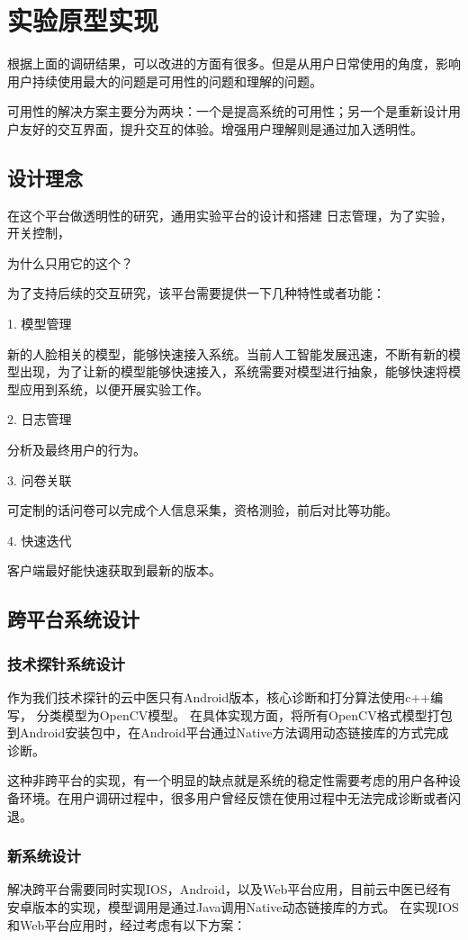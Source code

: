 \chapter{实验原型实现}
根据上面的调研结果，可以改进的方面有很多。但是从用户日常使用的角度，影响用户持续使用最大的问题是可用性的问题和理解的问题。

可用性的解决方案主要分为两块：一个是提高系统的可用性；另一个是重新设计用户友好的交互界面，提升交互的体验。增强用户理解则是通过加入透明性。

\section{设计理念}

在这个平台做透明性的研究，通用实验平台的设计和搭建
日志管理，为了实验，
开关控制，

为什么只用它的这个？

为了支持后续的交互研究，该平台需要提供一下几种特性或者功能：

1. 模型管理

新的人脸相关的模型，能够快速接入系统。当前人工智能发展迅速，不断有新的模型出现，为了让新的模型能够快速接入，系统需要对模型进行抽象，能够快速将模型应用到系统，以便开展实验工作。

2. 日志管理

分析及最终用户的行为。

3. 问卷关联

可定制的话问卷可以完成个人信息采集，资格测验，前后对比等功能。

4. 快速迭代

客户端最好能快速获取到最新的版本。

\section{跨平台系统设计}
\subsection{技术探针系统设计}
作为我们技术探针的云中医只有Android版本，核心诊断和打分算法使用c++编写， 分类模型为OpenCV模型。
在具体实现方面，将所有OpenCV格式模型打包到Android安装包中，在Android平台通过Native方法调用动态链接库的方式完成诊断。

这种非跨平台的实现，有一个明显的缺点就是系统的稳定性需要考虑的用户各种设备环境。在用户调研过程中，很多用户曾经反馈在使用过程中无法完成诊断或者闪退。

\subsection{新系统设计}
解决跨平台需要同时实现IOS，Android，以及Web平台应用，目前云中医已经有安卓版本的实现，模型调用是通过Java调用Native动态链接库的方式。
在实现IOS和Web平台应用时，经过考虑有以下方案：


